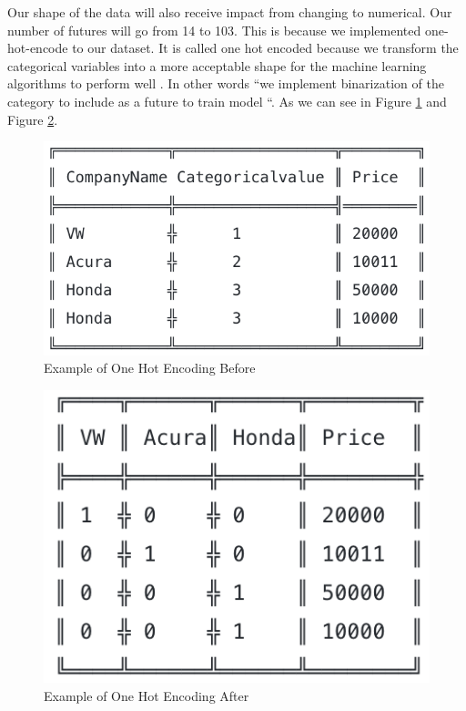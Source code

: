 \documentclass[sigconf]{acmart}
\begin{document}
\par Our shape of the data will also receive impact from changing to numerical. Our number of futures will go from 14 to 103. This is because we implemented one-hot-encode to our dataset. It is called one hot encoded because we transform the categorical variables into a more acceptable shape for the machine learning algorithms to perform well \cite{www-hackernoon}. In other words ``we implement binarization of the category to include as a future to train model \cite{www-hackernoon}``. As we can see in Figure \ref{fig:one-hot-before} and Figure \ref{fig:one-hot-after}.

 \begin{figure}[!ht]
  \centering
      \includegraphics[width=\columnwidth]{images/one-hot-before.png}
  \caption{Example of One Hot Encoding Before \cite{www-hackernoon}}\label{fig:one-hot-before}
\end{figure}

 \begin{figure}[!ht]
  \centering
      \includegraphics[width=\columnwidth]{images/one-hot-after.png}
  \caption{Example of One Hot Encoding After \cite{www-hackernoon}}\label{fig:one-hot-after}
\end{figure}
\end{document}
